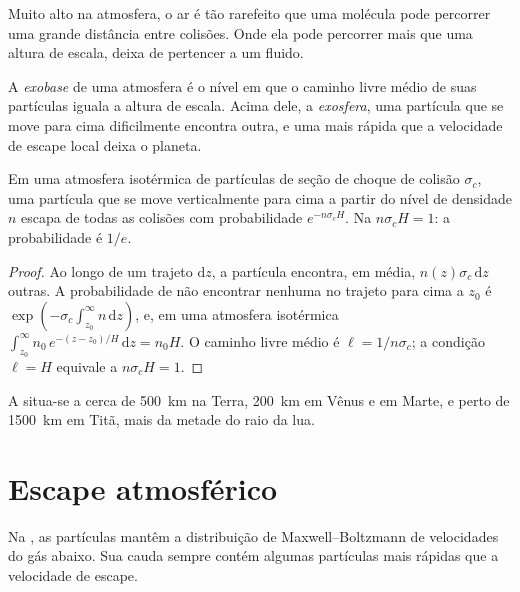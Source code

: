 Muito alto na atmosfera, o ar é tão rarefeito que uma molécula pode percorrer uma grande distância
entre colisões. Onde ela pode percorrer mais que uma altura de escala, deixa de
pertencer a um fluido.

\begin{definition}\label{def:b3:planetary-atmospheres:exobase}
A \emph{exobase} de uma atmosfera é o nível em que o
caminho livre médio de suas partículas iguala a altura de escala. Acima dele,
a \emph{exosfera}, uma partícula que se move para cima
dificilmente encontra outra, e uma mais rápida que a velocidade de escape local
deixa o planeta.
\end{definition}

\begin{proposition}\label{prop:b3:planetary-atmospheres:exobase}
Em uma atmosfera isotérmica de partículas de seção de choque de colisão
$\sigma_c$, uma partícula que se move verticalmente para cima a partir do nível de densidade
$n$ escapa de todas as colisões com probabilidade $e^{-n\sigma_c H}$. Na
 $n\sigma_c H = 1$: a probabilidade é $1/e$.
\end{proposition}

\begin{proof}
Ao longo de um trajeto $\mathrm dz$, a partícula encontra, em média, $n(z)\sigma_c\,
\mathrm dz$ outras. A probabilidade de não encontrar nenhuma no trajeto para cima a
$z_0$ é $\exp(-\sigma_c\int_{z_0}^\infty n\,\mathrm dz)$, e, em uma
atmosfera isotérmica $\int_{z_0}^\infty n_0\,e^{-(z-z_0)/H}\,\mathrm dz
= n_0 H$. O caminho livre médio é $\ell = 1/n\sigma_c$; a condição $\ell
= H$ equivale a $n\sigma_c H = 1$.
\end{proof}

A  situa-se a cerca de \qty{500}{km} na Terra, \qty{200}{km} em
Vênus e em Marte, e perto de \qty{1500}{km} em Titã, mais da metade do
raio da lua.

\section{Escape atmosférico}\label{sec:b3:planetary-atmospheres:escape}

Na , as partículas mantêm a distribuição de Maxwell--Boltzmann de
velocidades do gás abaixo. Sua cauda sempre contém algumas partículas mais rápidas que
a velocidade de escape.

